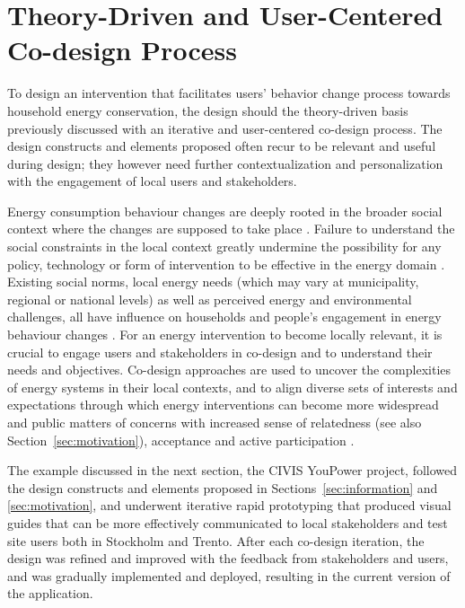 \documentclass[a4paper]{article}
\begin{document}
\section{Theory-Driven and User-Centered Co-design Process}
\label{sec:codesign}

To design an intervention that facilitates users' behavior change process towards household energy conservation, the design should the theory-driven basis previously discussed with an iterative and user-centered co-design process. The design constructs and elements proposed often recur to be relevant and useful during design; they however need further contextualization and personalization with the engagement of local users and stakeholders. 

Energy consumption behaviour changes are deeply rooted in the broader social context where the changes are supposed to take place \citep{Owens2008}. Failure to understand the social constraints in the local context greatly undermine the possibility for any policy, technology or form of intervention to be effective in the energy domain \citep{Devine-Wright2005}. Existing social norms, local energy needs (which may vary at municipality, regional or national levels) as well as perceived energy and environmental challenges, all have influence on households and people's engagement in energy behaviour changes \citep{+}. For an energy intervention to become locally relevant, it is crucial to engage users and stakeholders in co-design and to understand their needs and objectives. Co-design approaches are used to uncover the complexities of energy systems in their local contexts, and to align diverse sets of interests and expectations \citep{Tang2008,Dick2012} through which energy interventions can become more widespread and public matters of concerns \citep{DiSalvo2014} with increased sense of relatedness (see also Section~\ref{sec:motivation}), acceptance and active participation \citep{Throndsen2015,Marres2012,Brynjarsdottir2012,pierce2003state,schwartz2015people,edward2015review}. 

The example discussed in the next section, the CIVIS YouPower project, followed the design constructs and elements proposed in Sections~\ref{sec:information} and \ref{sec:motivation}, and underwent iterative rapid prototyping that produced visual guides that can be more effectively communicated to local stakeholders and test site users both in Stockholm and Trento. After each co-design iteration, the design was refined and improved with the feedback from stakeholders and users, and was gradually implemented and deployed, resulting in the current version of the application.
\end{document}
